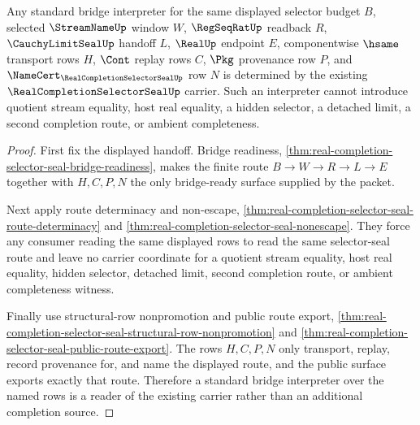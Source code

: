 \begin{theorem}
\label{thm:real-completion-selector-seal-standard-bridge-premise}
Any standard bridge interpreter for the same displayed selector budget $B$, selected $\StreamNameUp$ window $W$, $\RegSeqRatUp$ readback $R$, $\CauchyLimitSealUp$ handoff $L$, $\RealUp$ endpoint $E$, componentwise $\hsame$ transport rows $H$, $\Cont$ replay rows $C$, $\Pkg$ provenance row $P$, and $\NameCert_{\RealCompletionSelectorSealUp}$ row $N$ is determined by the existing $\RealCompletionSelectorSealUp$ carrier. Such an interpreter cannot introduce quotient stream equality, host real equality, a hidden selector, a detached limit, a second completion route, or ambient completeness.
\end{theorem}
\begin{proof}
First fix the displayed handoff. Bridge readiness, \autoref{thm:real-completion-selector-seal-bridge-readiness}, makes the finite route $B \to W \to R \to L \to E$ together with $H,C,P,N$ the only bridge-ready surface supplied by the packet.

Next apply route determinacy and non-escape, \autoref{thm:real-completion-selector-seal-route-determinacy} and \autoref{thm:real-completion-selector-seal-nonescape}. They force any consumer reading the same displayed rows to read the same selector-seal route and leave no carrier coordinate for a quotient stream equality, host real equality, hidden selector, detached limit, second completion route, or ambient completeness witness.

Finally use structural-row nonpromotion and public route export, \autoref{thm:real-completion-selector-seal-structural-row-nonpromotion} and \autoref{thm:real-completion-selector-seal-public-route-export}. The rows $H,C,P,N$ only transport, replay, record provenance for, and name the displayed route, and the public surface exports exactly that route. Therefore a standard bridge interpreter over the named rows is a reader of the existing carrier rather than an additional completion source.
\end{proof}

